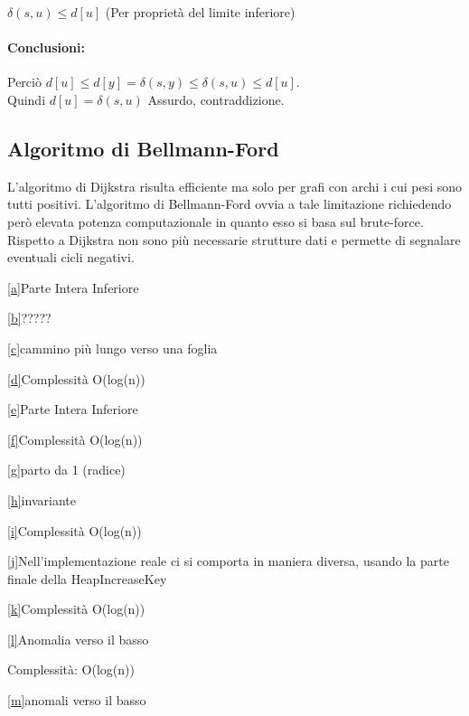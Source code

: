 \documentclass{article}
\let\oldparagraph\paragraph
\renewcommand{\paragraph}[1]{\oldparagraph{#1}\mbox{}}
\begin{document}
{$\delta(s,u) \leq d[u]$ (Per proprietà del limite inferiore)

\paragraph{Conclusioni:}

Perciò $d[u] \leq d[y] = \delta(s,y) \leq \delta(s,u) \leq d[u]$. \\ Quindi $d[u]= \delta(s,u)$ Assurdo, contraddizione.


\subsection{Algoritmo di Bellmann-Ford}

{L'algoritmo di Dijkstra risulta efficiente ma solo per grafi con archi i cui pesi sono tutti positivi. L'algoritmo di Bellmann-Ford ovvia a tale limitazione richiedendo però elevata potenza computazionale in quanto esso si basa sul brute-force. Rispetto a Dijkstra non sono più necessarie strutture dati e permette di segnalare eventuali cicli negativi.}

\protect\hyperlink{cmnt_ref1}{{[}a{]}}{Parte Intera Inferiore}

\protect\hyperlink{cmnt_ref2}{{[}b{]}}{?????}

\protect\hyperlink{cmnt_ref3}{{[}c{]}}{cammino più lungo verso una
foglia}

\protect\hyperlink{cmnt_ref4}{{[}d{]}}{Complessità O(log(n))}

\protect\hyperlink{cmnt_ref5}{{[}e{]}}{Parte Intera Inferiore}

\protect\hyperlink{cmnt_ref6}{{[}f{]}}{Complessità O(log(n))}

\protect\hyperlink{cmnt_ref7}{{[}g{]}}{parto da 1 (radice)}

\protect\hyperlink{cmnt_ref8}{{[}h{]}}{invariante}

\protect\hyperlink{cmnt_ref9}{{[}i{]}}{Complessità O(log(n))}

\protect\hyperlink{cmnt_ref10}{{[}j{]}}{Nell'implementazione reale ci si
comporta in maniera diversa, usando la parte finale della
HeapIncreaseKey}

\protect\hyperlink{cmnt_ref11}{{[}k{]}}{Complessità O(log(n))}

\protect\hyperlink{cmnt_ref12}{{[}l{]}}{Anomalia verso il basso}

{Complessità: O(log(n))}

\protect\hyperlink{cmnt_ref13}{{[}m{]}}{anomali verso il basso}

}
\end{document}
